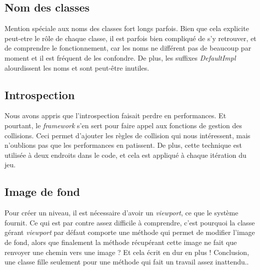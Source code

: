 \documentclass[a4paper,10pt]{article}
\begin{document}
    \subsection{Nom des classes}
        Mention spéciale aux noms des classes fort longs parfois. Bien que cela explicite peut-etre le rôle
        de chaque classe, il est parfois bien compliqué de s'y retrouver, et de comprendre le fonctionnement,
        car les noms ne différent pas de beaucoup par moment et il est fréquent de les confondre.
        De plus, les suffixes \textit{DefaultImpl} alourdissent les noms et sont peut-être inutiles.

    \subsection{Introspection}
       	 Nous avons appris que l'introspection faisait perdre en performances. Et pourtant, le \textit{framework} s'en sert
        pour faire appel aux fonctions de gestion des collisions. Ceci permet d'ajouter les règles de collision
        qui nous intéressent, mais n'oublions pas que les performances en patissent. De plus, cette technique est
        utilisée à deux endroits dans le code, et cela est appliqué à chaque itération du jeu.

    \subsection{Image de fond}
        Pour créer un niveau, il est nécessaire d'avoir un \textit{viewport}, ce que le système fournit. Ce qui est
        par contre assez difficile à comprendre, c'est pourquoi la classe gérant \textit{viewport} par défaut
        comporte une méthode qui permet de modifier l'image de fond, alors que finalement la méthode récupérant
        cette image ne fait que renvoyer une chemin vers une image ? Et cela écrit en dur en plus ! Conclusion, une classe
        fille seulement pour une méthode qui fait un travail assez inattendu..
\end{document}
